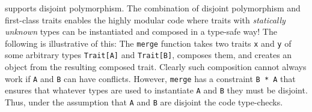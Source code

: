 \begin{comment}
One important difference to traditional traits or classes is that traits in
\sedel are quite dynamic: we are able to compose traits \emph{dynamically} and
then instantiate them later. We have seen an example of dynamic inheritance in
\cref{sec:trait:overview} to mimic mixins, where disjoint polymorphism plays an
important role. This is impossible in traditional OO languages, such as Scala,
since classes being inherited/instantiated must be known statically.

In Scala, given two concrete traits, it is possible to use \emph{mixin composition} to
create an object that implements both traits.
\begin{lstlisting}[language=scala]
trait A
trait B
val newAB : A with B = new A with B
\end{lstlisting}
Here the type \lstinline[language=scala]{A with B} is an intersection type,
and the expression \lstinline[language=scala]{new A with B} allows creating a new
object from the combination of the traits \lstinline{A} and
\lstinline{B}.
However, in Scala it is not possible to dynamically compose two
(statically unknown) \emph{objects}. For example, the following code: \jeremy{how is this useful to have?}
\begin{lstlisting}[language=scala]
// Invalid Scala code:
def merge[A,B] (x: A) (y: B) : A with B = new x with y
\end{lstlisting}
is rejected by the Scala compiler. The problem is that the
\lstinline[language=scala]{with} construct in Scala can only be used to mixin
(statically known) traits or classes, not arbitrary objects. This limitation essentially puts
intersection types in Scala in a second-class status.
\end{comment}

\sedel supports disjoint polymorphism. The combination of disjoint
polymorphism and first-class traits enables the highly modular code
where traits with \emph{statically unknown} types can be instantiated
and composed in a type-safe way! The following is illustrative of this:
The \lstinline{merge} function takes two traits \lstinline{x} and \lstinline{y} of
some arbitrary types \lstinline{Trait[A]} and \lstinline{Trait[B]}, composes them,
and creates an object from the resulting composed trait. Clearly
such composition cannot always work if \lstinline{A} and
\lstinline{B} can have conflicts. However, \lstinline{merge} has a
constraint \lstinline{B * A} that ensures that whatever types are used
to instantiate \lstinline{A} and \lstinline{B} they must be disjoint.
Thus, under the assumption that \lstinline{A} and \lstinline{B} are
disjoint the code type-checks.

